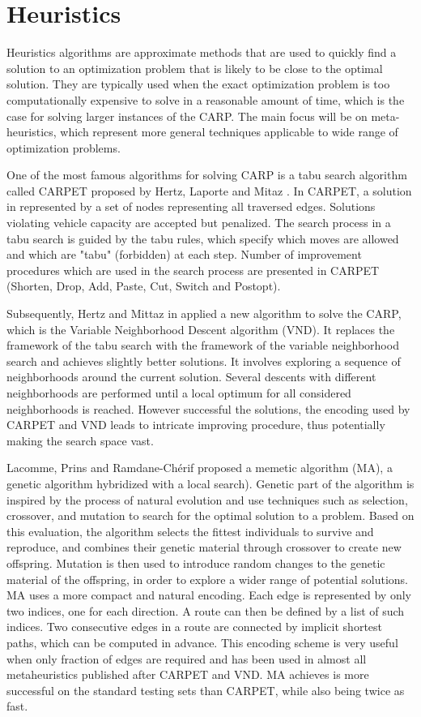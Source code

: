 \documentclass[oneside]{ctuthesis}
\theoremstyle{plain}
\theoremstyle{definition}
\theoremstyle{note}
\begin{document}
\section{Heuristics}
Heuristics algorithms are approximate methods that are used to quickly find a solution to an optimization problem that is likely to be close to the optimal solution. They are typically used when the exact optimization problem is too computationally expensive to solve in a reasonable amount of time, which is the case for solving larger instances of the CARP. The main focus will be on meta-heuristics, which represent more general techniques applicable to wide range of optimization problems.

One of the most famous algorithms for solving CARP is a tabu search algorithm called CARPET proposed by Hertz, Laporte and Mitaz \cite{hertz2000tabu}. In CARPET, a solution in represented by a set of nodes representing all traversed edges. Solutions violating vehicle capacity are accepted but penalized. The search process in a tabu search is guided by the tabu rules, which specify which moves are allowed and which are "tabu" (forbidden) at each step. Number of improvement procedures which are used in the search process are presented in CARPET (Shorten, Drop, Add, Paste, Cut, Switch and Postopt).

Subsequently, Hertz and Mittaz in \cite{hertz2001variable} applied a new algorithm to solve the CARP, which is the Variable Neighborhood Descent algorithm (VND). It replaces the framework of the tabu search with the framework of the variable neighborhood search and achieves slightly better solutions. It involves exploring a sequence of neighborhoods around the current solution. Several descents with different neighborhoods are performed until a local optimum for all considered neighborhoods is reached. However successful the solutions, the encoding used by CARPET and VND leads to intricate improving procedure, thus potentially making the search space vast.

Lacomme, Prins and Ramdane-Ch{\'e}rif \cite{lacomme2001genetic} proposed a memetic algorithm (MA), a genetic algorithm hybridized with a local search). Genetic part of the algorithm is inspired by the process of natural evolution and use techniques such as selection, crossover, and mutation to search for the optimal solution to a problem. Based on this evaluation, the algorithm selects the fittest individuals to survive and reproduce, and combines their genetic material through crossover to create new offspring. Mutation is then used to introduce random changes to the genetic material of the offspring, in order to explore a wider range of potential solutions. MA uses a more compact and natural encoding. Each edge is represented by only two indices, one for each direction. A route can then be defined by a list of such indices. Two consecutive edges in a route are connected by implicit shortest paths, which can be computed in advance. This encoding scheme is very useful when only fraction of edges are required and has been used in almost all metaheuristics published after CARPET and VND. MA achieves is more successful on the standard testing sets than CARPET, while also being twice as fast.
\end{document}
